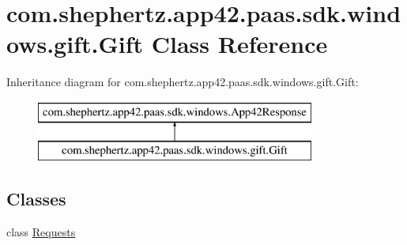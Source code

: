 \hypertarget{classcom_1_1shephertz_1_1app42_1_1paas_1_1sdk_1_1windows_1_1gift_1_1_gift}{\section{com.\+shephertz.\+app42.\+paas.\+sdk.\+windows.\+gift.\+Gift Class Reference}
\label{classcom_1_1shephertz_1_1app42_1_1paas_1_1sdk_1_1windows_1_1gift_1_1_gift}
}
Inheritance diagram for com.\+shephertz.\+app42.\+paas.\+sdk.\+windows.\+gift.\+Gift\+:\begin{figure}[H]
\begin{center}
\leavevmode
\includegraphics[height=2.000000cm]{classcom_1_1shephertz_1_1app42_1_1paas_1_1sdk_1_1windows_1_1gift_1_1_gift}
\end{center}
\end{figure}
\subsection*{Classes}
\begin{DoxyCompactItemize}
\item 
class \hyperlink{classcom_1_1shephertz_1_1app42_1_1paas_1_1sdk_1_1windows_1_1gift_1_1_gift_1_1_requests}{Requests}
\end{DoxyCompactItemize}
